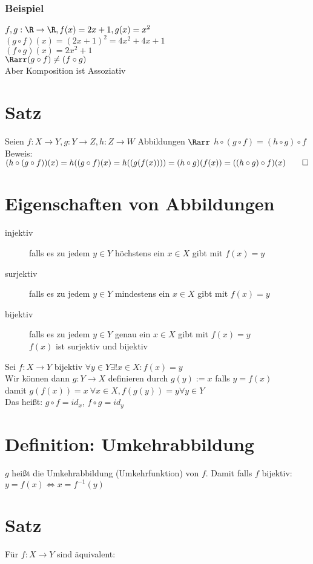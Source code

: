 \subsubsection*{Beispiel}
$f, g: \R \to \R, f(x) = 2x+1 , g(x) = x^2$\\
$(g \circ f)(x) = (2x+1)^2 = 4x^2 + 4x + 1$\\
$(f \circ g)(x) = 2x^2 + 1$\\
$\Rarr (g \circ f) \neq (f \circ g)$\\
Aber Komposition ist Assoziativ
\section{Satz}
Seien $f:X\to Y, g:Y\to Z, h:Z\to W$ Abbildungen $\Rarr$ $h \circ (g \circ f) = (h \circ g) \circ f$\\
Beweis: $(h\circ (g\circ f))(x) = h((g\circ f)(x) = h((g(f(x)))) = (h \circ g)(f(x)) = ((h \circ g) \circ f)(x) \qed$
\section{Eigenschaften von Abbildungen}
\begin{description}
\item[injektiv] falls es zu jedem $y \in Y$ höchstens ein $x \in X$ gibt mit $f(x) = y$
\item[surjektiv] falls es zu jedem $y \in Y$ mindestens ein $x \in X$ gibt mit $f(x) = y$
\item[bijektiv] falls es zu jedem $y \in Y$ genau ein $x \in X$ gibt mit $f(x) = y$\\
$f(x)$ ist surjektiv und bijektiv
\end{description}
Sei $f:X\to Y$ bijektiv $\forall y\in Y \exists! x\in X: f(x) = y$\\
Wir können dann $g: Y\to X$ definieren durch $g(y) := x$ falls $y = f(x)$\\
damit $g(f(x)) = x\ \forall x\in X, f(g(y)) = y \forall y\in Y$\\
Das heißt: $g\circ f = id_x$, $f \circ g = id_y$
\section{Definition: Umkehrabbildung}
$g$ heißt die Umkehrabbildung (Umkehrfunktion) von $f$. 
Damit falls $f$ bijektiv: $y = f(x) \Leftrightarrow x = f^{-1}(y)$
\section{Satz}
Für $f: X\to Y$ sind äquivalent:
